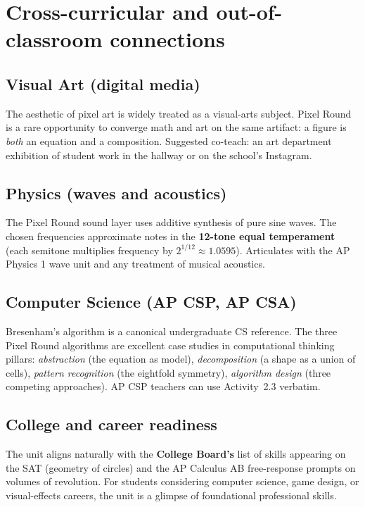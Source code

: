 \documentclass[12pt,letterpaper]{scrartcl}
\newcommand{\acc}[1]{\textcolor{accent}{\textbf{#1}}}
\begin{document}
\section{Cross-curricular and out-of-classroom connections}

\subsection{Visual Art (digital media)}
The aesthetic of pixel art is widely treated as a visual-arts subject. Pixel Round is a rare opportunity to converge math and art on the same artifact: a figure is \emph{both} an equation and a composition. Suggested co-teach: an art department exhibition of student work in the hallway or on the school's Instagram.

\subsection{Physics (waves and acoustics)}
The Pixel Round sound layer uses additive synthesis of pure sine waves. The chosen frequencies approximate notes in the \acc{12-tone equal temperament} (each semitone multiplies frequency by $2^{1/12} \approx 1.0595$). Articulates with the AP Physics 1 wave unit and any treatment of musical acoustics.

\subsection{Computer Science (AP CSP, AP CSA)}
Bresenham's algorithm is a canonical undergraduate CS reference. The three Pixel Round algorithms are excellent case studies in computational thinking pillars: \emph{abstraction} (the equation as model), \emph{decomposition} (a shape as a union of cells), \emph{pattern recognition} (the eightfold symmetry), \emph{algorithm design} (three competing approaches). AP CSP teachers can use Activity~2.3 verbatim.

\subsection{College and career readiness}
The unit aligns naturally with the \acc{College Board's} list of skills appearing on the SAT (geometry of circles) and the AP Calculus AB free-response prompts on volumes of revolution. For students considering computer science, game design, or visual-effects careers, the unit is a glimpse of foundational professional skills.
\end{document}
